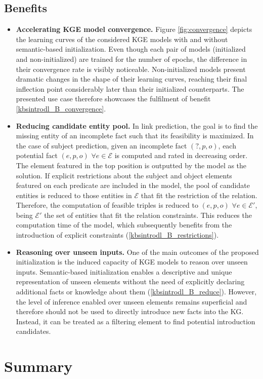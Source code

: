\subsection{Benefits}
\begin{itemize}
    \item \textbf{Accelerating KGE model convergence.} Figure \ref{fig:convergence} depicts the learning curves of the considered KGE models with and without semantic-based initialization. Even though each pair of models (initialized and non-initialized) are trained for the number of epochs, the difference in their convergence rate is visibly noticeable. Non-initialized models present dramatic changes in the shape of their learning curves, reaching their final inflection point considerably later than their initialized counterparts. The presented use case therefore showcases the fulfilment of benefit \ref{kbsintrodl_B_convergence}.
    
    \item \textbf{Reducing candidate entity pool.} In link prediction, the goal is to find the missing entity of an incomplete fact such that its feasibility is maximized. In the case of subject prediction, given an incomplete fact $(?,p,o)$, each potential fact $(e,p,o)$ $\forall e \in \mathcal{E}$ is computed and rated in decreasing order. The element featured in the top position is outputted by the model as the solution. If explicit restrictions about the subject and object elements featured on each predicate are included in the model, the pool of candidate entities is reduced to those entities in $\mathcal{E}$ that fit the restriction of the relation. Therefore, the computation of feasible triples is reduced to $(e,p,o)$ $\forall e \in \mathcal{E}'$, being $\mathcal{E}'$ the set of entities that fit the relation constraints. This reduces the computation time of the model, which subsequently benefits from the introduction of explicit constraints (\ref{kbsintrodl_B_restrictions}).
    
    \item \textbf{Reasoning over unseen inputs.} One of the main outcomes of the proposed initialization is the induced capacity of KGE models to reason over unseen inputs. Semantic-based initialization enables a descriptive and unique representation of unseen elements without the need of explicitly declaring additional facts or knowledge about them (\ref{kbsintrodl_B_reduce}). However, the level of inference enabled over unseen elements remains superficial and therefore should not be used to directly introduce new facts into the KG. Instead, it can be treated as a filtering element to find potential introduction candidates.
\end{itemize}


\section{Summary}\label{4_sec:summary}
